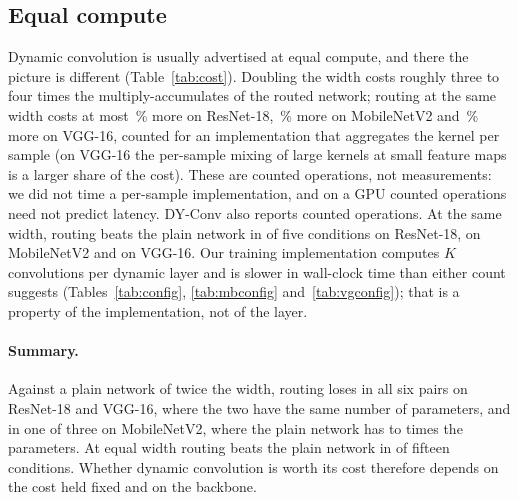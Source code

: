 \documentclass[10pt,a4paper]{article}
\begin{document}
\subsection{Equal compute}

Dynamic convolution is usually advertised at equal compute, and there the
picture is different (Table~\ref{tab:cost}). Doubling the width costs
roughly three to four times the multiply-accumulates of the routed network;
routing at the same width costs at most \,\% more on
ResNet-18, \,\% more on MobileNetV2 and \,\%
more on VGG-16, counted for an implementation that aggregates the kernel
per sample (on VGG-16 the per-sample mixing of large kernels at small
feature maps is a larger share of the cost). These are counted operations,
not measurements: we did not time a per-sample implementation, and on a
GPU counted operations need not predict latency. DY-Conv also reports
counted operations. At the same width, routing
beats the plain network in  of five conditions on ResNet-18,
 on MobileNetV2 and  on VGG-16. Our training
implementation computes $K$ convolutions per dynamic layer and is slower in
wall-clock time than either count suggests (Tables~\ref{tab:config},
\ref{tab:mbconfig} and~\ref{tab:vgconfig}); that is a property of the
implementation, not of the layer.

\paragraph{Summary.} Against a plain network of twice the width, routing
loses in all six pairs on ResNet-18 and VGG-16, where the two have the same
number of parameters, and in one of three on MobileNetV2, where the plain
network has  to  times the parameters. At equal
width routing beats the plain network in  of fifteen conditions.
Whether dynamic convolution is worth its cost therefore depends on the
cost held fixed and on the backbone.

\begin{table}[!htbp]\centering\small
\caption{The routed network under two cost views. Left: \texttt{static}
at width $2c$ minus \texttt{gap} at width $c$, with the parameter ratio
routed/plain and the multiply-accumulate (MAC) ratio plain/routed.
Right: \texttt{gap} minus \texttt{static} at the same width, with the MAC
ratio routed/plain. MACs per image are counted for per-sample kernel
aggregation.}
\label{tab:cost}
\end{table}
\end{document}
